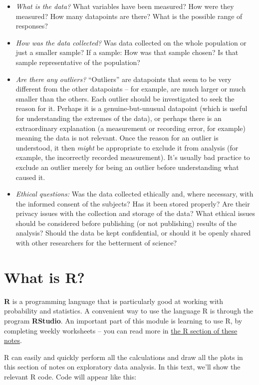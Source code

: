 \documentclass[
  a4paper,
]{book}
\providecommand{\tightlist}{%
  \setlength{\itemsep}{0pt}\setlength{\parskip}{0pt}}
\theoremstyle{definition}
\theoremstyle{definition}
\theoremstyle{definition}
\theoremstyle{definition}
\theoremstyle{remark}
\begin{document}
\begin{itemize}
\tightlist
\item
  \emph{What is the data?} What variables have been measured? How were they measured? How many datapoints are there? What is the possible range of responses?
\item
  \emph{How was the data collected?} Was data collected on the whole population or just a smaller sample? If a sample: How was that sample chosen? Is that sample representative of the population?
\item
  \emph{Are there any outliers?} ``Outliers'' are datapoints that seem to be very different from the other datapoints -- for example, are much larger or much smaller than the others. Each outlier should be investigated to seek the reason for it. Perhaps it is a genuine-but-unusual datapoint (which is useful for understanding the extremes of the data), or perhaps there is an extraordinary explanation (a measurement or recording error, for example) meaning the data is not relevant. Once the reason for an outlier is understood, it then \emph{might} be appropriate to exclude it from analysis (for example, the incorrectly recorded measurement). It's usually bad practice to exclude an outlier merely for being an outlier before understanding what caused it.
\item
  \emph{Ethical questions:} Was the data collected ethically and, where necessary, with the informed consent of the subjects? Has it been stored properly? Are their privacy issues with the collection and storage of the data? What ethical issues should be considered before publishing (or not publishing) results of the analysis? Should the data be kept confidential, or should it be openly shared with other researchers for the betterment of science?
\end{itemize}

\hypertarget{what-is-R}{%
\section{What is R?}\label{what-is-R}}

\textbf{R} is a programming language that is particularly good at working with probability and statistics. A convenient way to use the language R is through the program \textbf{RStudio}. An important part of this module is learning to use R, by completing weekly worksheets -- you can read more in \protect\hyperlink{R}{the R section of these notes}.

R can easily and quickly perform all the calculations and draw all the plots in this section of notes on exploratory data analysis. In this text, we'll show the relevant R code. Code will appear like this:
\end{document}
